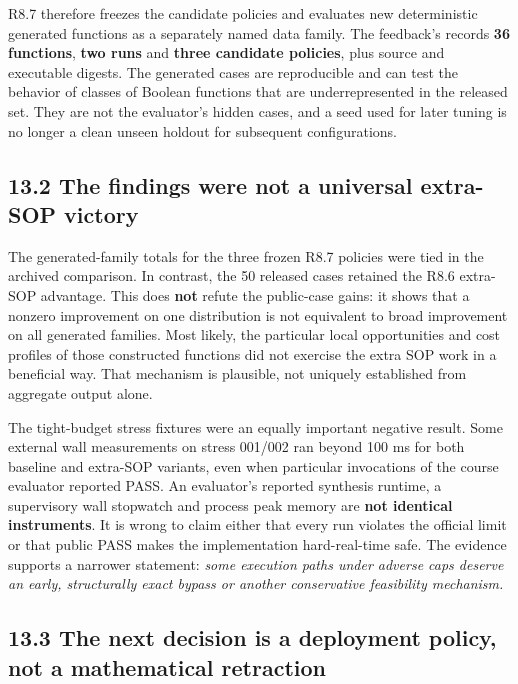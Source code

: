 R8.7 therefore freezes the candidate policies and evaluates new deterministic generated functions as a separately named data family. The feedback's  records \textbf{36 functions}, \textbf{two runs} and \textbf{three candidate policies}, plus source and executable digests. The generated cases are reproducible and can test the behavior of classes of Boolean functions that are underrepresented in the released set. They are not the evaluator's hidden cases, and a seed used for later tuning is no longer a clean unseen holdout for subsequent configurations.

\subsection{13.2 The findings were not a universal extra-SOP victory}\label{the-findings-were-not-a-universal-extra-sop-victory}

The generated-family totals for the three frozen R8.7 policies were tied in the archived comparison. In contrast, the 50 released cases retained the R8.6 extra-SOP advantage. This does \textbf{not} refute the public-case gains: it shows that a nonzero improvement on one distribution is not equivalent to broad improvement on all generated families. Most likely, the particular local opportunities and cost profiles of those constructed functions did not exercise the extra SOP work in a beneficial way. That mechanism is plausible, not uniquely established from aggregate output alone.

The tight-budget stress fixtures were an equally important negative result. Some external wall measurements on stress 001/002 ran beyond 100 ms for both baseline and extra-SOP variants, even when particular invocations of the course evaluator reported PASS. An evaluator's reported synthesis runtime, a supervisory wall stopwatch and process peak memory are \textbf{not identical instruments}. It is wrong to claim either that every run violates the official limit or that public PASS makes the implementation hard-real-time safe. The evidence supports a narrower statement: \emph{some execution paths under adverse caps deserve an early, structurally exact bypass or another conservative feasibility mechanism.}

\subsection{13.3 The next decision is a deployment policy, not a mathematical retraction}\label{the-next-decision-is-a-deployment-policy-not-a-mathematical-retraction}


